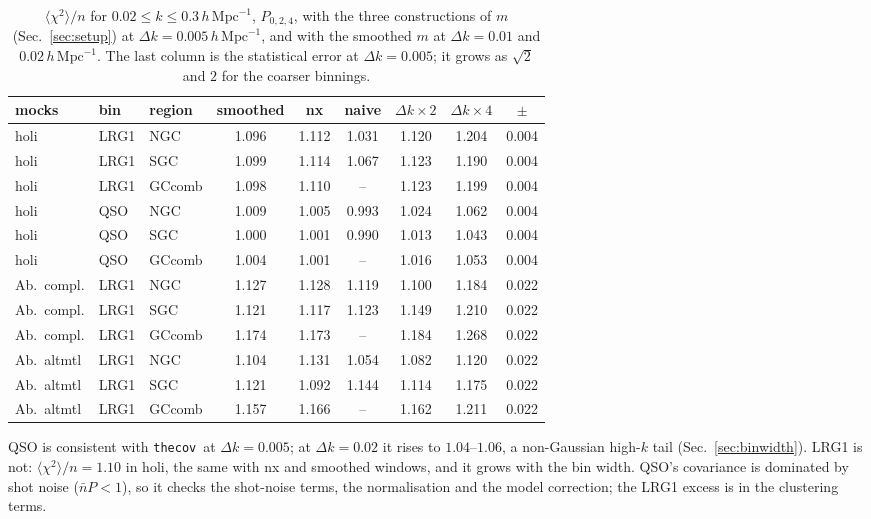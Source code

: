 \documentclass[11pt]{article}
\newcommand{\thecov}{\texttt{thecov}}
\newcommand{\hk}{\,h\,\mathrm{Mpc}^{-1}}
\begin{document}
\begin{table}[h]
\centering\small
\begin{tabular}{lll cccccc}
\toprule
mocks & bin & region & smoothed & nx & naive & $\Delta k\times2$ & $\Delta k\times4$ & $\pm$\\
\midrule
holi & LRG1 & NGC & 1.096 & 1.112 & 1.031 & 1.120 & 1.204 & 0.004\\
holi & LRG1 & SGC & 1.099 & 1.114 & 1.067 & 1.123 & 1.190 & 0.004\\
holi & LRG1 & GCcomb & 1.098 & 1.110 & -- & 1.123 & 1.199 & 0.004\\
holi & QSO & NGC & 1.009 & 1.005 & 0.993 & 1.024 & 1.062 & 0.004\\
holi & QSO & SGC & 1.000 & 1.001 & 0.990 & 1.013 & 1.043 & 0.004\\
holi & QSO & GCcomb & 1.004 & 1.001 & -- & 1.016 & 1.053 & 0.004\\
Ab.\ compl. & LRG1 & NGC & 1.127 & 1.128 & 1.119 & 1.100 & 1.184 & 0.022\\
Ab.\ compl. & LRG1 & SGC & 1.121 & 1.117 & 1.123 & 1.149 & 1.210 & 0.022\\
Ab.\ compl. & LRG1 & GCcomb & 1.174 & 1.173 & -- & 1.184 & 1.268 & 0.022\\
Ab.\ altmtl & LRG1 & NGC & 1.104 & 1.131 & 1.054 & 1.082 & 1.120 & 0.022\\
Ab.\ altmtl & LRG1 & SGC & 1.121 & 1.092 & 1.144 & 1.114 & 1.175 & 0.022\\
Ab.\ altmtl & LRG1 & GCcomb & 1.157 & 1.166 & -- & 1.162 & 1.211 & 0.022\\
\bottomrule
\end{tabular}
\caption{$\langle\chi^2\rangle/n$ for $0.02\le k\le0.3\hk$, $P_{0,2,4}$, with the three constructions of $m$ (Sec.~\ref{sec:setup}) at $\Delta k=0.005\hk$, and with the smoothed $m$ at $\Delta k=0.01$ and $0.02\hk$. The last column is the statistical error at $\Delta k=0.005$; it grows as $\sqrt{2}$ and $2$ for the coarser binnings.}
\label{tab:chi2}
\end{table}

QSO is consistent with \thecov\ at $\Delta k=0.005$; at $\Delta k=0.02$ it rises to $1.04$--$1.06$, a non-Gaussian high-$k$ tail (Sec.~\ref{sec:binwidth}). LRG1 is not: $\langle\chi^2\rangle/n=1.10$ in holi, the same with nx and smoothed windows, and it grows with the bin width. QSO's covariance is dominated by shot noise ($\bar nP<1$), so it checks the shot-noise terms, the normalisation and the model correction; the LRG1 excess is in the clustering terms.
\end{document}
